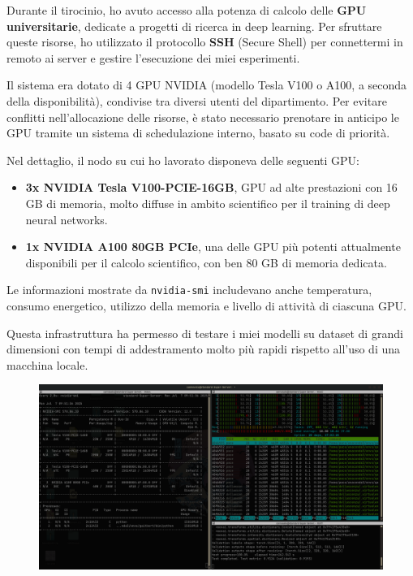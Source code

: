 
Durante il tirocinio, ho avuto accesso alla potenza di calcolo delle \textbf{GPU universitarie}, dedicate a progetti di ricerca in deep learning. Per sfruttare queste risorse, ho utilizzato il protocollo \textbf{SSH} (Secure Shell) per connettermi in remoto ai server e gestire l’esecuzione dei miei esperimenti.

Il sistema era dotato di 4 GPU NVIDIA (modello Tesla V100 o A100, a seconda della disponibilità), condivise tra diversi utenti del dipartimento. Per evitare conflitti nell’allocazione delle risorse, è stato necessario prenotare in anticipo le GPU tramite un sistema di schedulazione interno, basato su code di priorità.

Nel dettaglio, il nodo su cui ho lavorato disponeva delle seguenti GPU:
\begin{itemize}
\item \textbf{3x NVIDIA Tesla V100-PCIE-16GB}, GPU ad alte prestazioni con 16 GB di memoria, molto diffuse in ambito scientifico per il training di deep neural networks.
\item \textbf{1x NVIDIA A100 80GB PCIe}, una delle GPU più potenti attualmente disponibili per il calcolo scientifico, con ben 80 GB di memoria dedicata. 
\end{itemize}

Le informazioni mostrate da \texttt{nvidia-smi} includevano anche temperatura, consumo energetico, utilizzo della memoria e livello di attività di ciascuna GPU. 

Questa infrastruttura ha permesso di testare i miei modelli su dataset di grandi dimensioni con tempi di addestramento molto più rapidi rispetto all’uso di una macchina locale.

\begin{figure}[H] 
  	\centering 
 	\includegraphics[width=\textwidth]{images/2025-07-07-09-52-55.png} 
 \end{figure} 